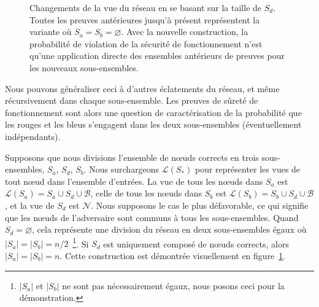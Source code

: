 \documentclass[a4,twocolumn,10pt]{article}
\let\emptyset\varnothing
\theoremstyle{definition}
\begin{document}
\begin{appendices}
{\begin{figure}
\caption{Changements de la vue du réseau en se basant sur la taille de $S_d$. Toutes les preuves antérieures jusqu'à présent représentent la variante où $S_a = S_b = \emptyset$. Avec la nouvelle construction, la probabilité de violation de la sécurité de fonctionnement n'est qu'une application directe des ensembles antérieurs de preuves pour les nouveaux sous-ensembles.}
\label{fig:network_view}
\end{figure}
Nous pouvons généraliser ceci à d'autres éclatements du réseau, et même récursivement dans chaque sous-ensemble. Les preuves de sûreté de fonctionnement sont alors une question de caractérisation de la probabilité que les rouges et les bleus s'engagent dans les deux sous-ensembles (éventuellement indépendants).

Supposons que nous divisions l'ensemble de nœuds corrects en trois sous-ensembles, $S_a$, $S_d$, $S_b$. Nous surchargeons $\mathcal{L}(S_{*})$ pour représenter les vues de tout nœud dans l'ensemble d'entrées. La vue de tous les nœuds dans $S_a$ est $\mathcal{L}(S_a) = S_a \cup S_d \cup \mathcal{B}$, celle de tous les nœuds dans $S_b$ est $\mathcal{L}(S_b) = S_b \cup S_d \cup \mathcal{B}$, et la vue de $S_d$ est $\mathcal{N}$. Nous supposons le cas le plus défavorable, ce qui signifie que les nœuds de l'adversaire sont communs à tous les sous-ensembles. Quand $S_d = \emptyset$, cela représente une division du réseau en deux sous-ensembles égaux où $|S_a| = |S_b| = n/2$~\footnote{$|S_a|$ et $|S_b|$ ne sont pas nécessairement égaux, nous posons ceci pour la démonstration.}. Si $S_d$ est uniquement composé de nœuds corrects, alors $|S_a| = |S_b| = n$. Cette construction est démontrée visuellement en figure~\ref{fig:network_view}.

}
\end{appendices}
\end{document}
